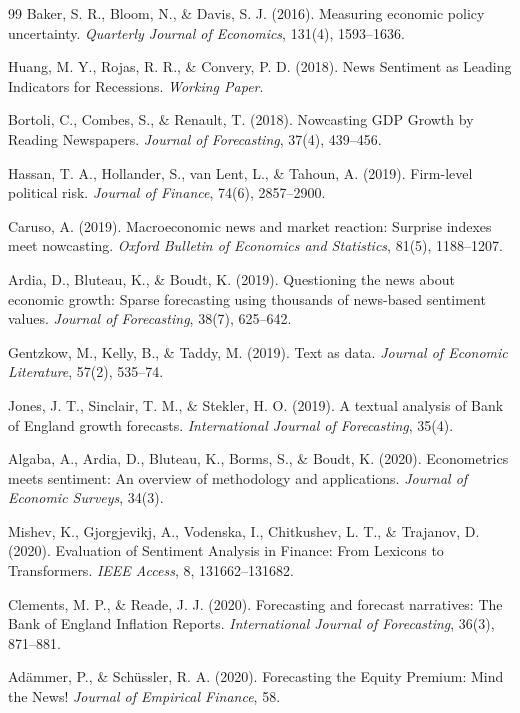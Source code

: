 \documentclass[11pt,twocolumn]{article}
\begin{document}
\begin{thebibliography}{99}
 Baker, S. R., Bloom, N., \& Davis, S. J. (2016). Measuring economic policy uncertainty. \textit{Quarterly Journal of Economics}, 131(4), 1593--1636.

 Huang, M. Y., Rojas, R. R., \& Convery, P. D. (2018). News Sentiment as Leading Indicators for Recessions. \textit{Working Paper}.

 Bortoli, C., Combes, S., \& Renault, T. (2018). Nowcasting GDP Growth by Reading Newspapers. \textit{Journal of Forecasting}, 37(4), 439--456.

 Hassan, T. A., Hollander, S., van Lent, L., \& Tahoun, A. (2019). Firm-level political risk. \textit{Journal of Finance}, 74(6), 2857--2900.

 Caruso, A. (2019). Macroeconomic news and market reaction: Surprise indexes meet nowcasting. \textit{Oxford Bulletin of Economics and Statistics}, 81(5), 1188--1207.

 Ardia, D., Bluteau, K., \& Boudt, K. (2019). Questioning the news about economic growth: Sparse forecasting using thousands of news-based sentiment values. \textit{Journal of Forecasting}, 38(7), 625--642.

 Gentzkow, M., Kelly, B., \& Taddy, M. (2019). Text as data. \textit{Journal of Economic Literature}, 57(2), 535--74.

 Jones, J. T., Sinclair, T. M., \& Stekler, H. O. (2019). A textual analysis of Bank of England growth forecasts. \textit{International Journal of Forecasting}, 35(4).

 Algaba, A., Ardia, D., Bluteau, K., Borms, S., \& Boudt, K. (2020). Econometrics meets sentiment: An overview of methodology and applications. \textit{Journal of Economic Surveys}, 34(3).

 Mishev, K., Gjorgjevikj, A., Vodenska, I., Chitkushev, L. T., \& Trajanov, D. (2020). Evaluation of Sentiment Analysis in Finance: From Lexicons to Transformers. \textit{IEEE Access}, 8, 131662--131682.

 Clements, M. P., \& Reade, J. J. (2020). Forecasting and forecast narratives: The Bank of England Inflation Reports. \textit{International Journal of Forecasting}, 36(3), 871--881.

 Adämmer, P., \& Schüssler, R. A. (2020). Forecasting the Equity Premium: Mind the News! \textit{Journal of Empirical Finance}, 58.


\end{thebibliography}
\end{document}
